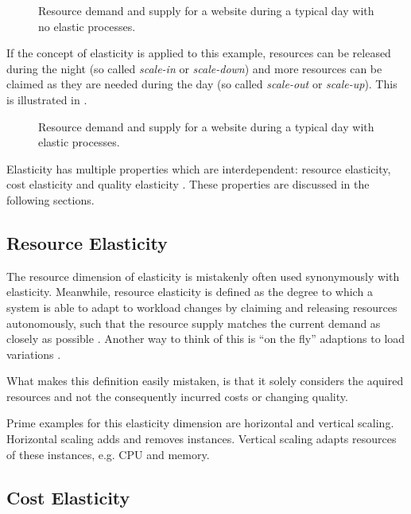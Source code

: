 \begin{figure}
    \centering
    
    \caption{Resource demand and supply for a website during a typical day with no elastic processes.}
    \label{fig:elasticity-application-no-scaling}
\end{figure}

If the concept of elasticity is applied to this example, resources can be released during the night (so called \textit{scale-in} or \textit{scale-down}) and more resources can be claimed as they are needed during the day (so called \textit{scale-out} or \textit{scale-up}). This is illustrated in .

\begin{figure}
    \centering
    
    \caption{Resource demand and supply for a website during a typical day with elastic processes.}
    \label{fig:elasticity-application-scaling}
\end{figure}

Elasticity has multiple properties which are interdependent: resource elasticity, cost elasticity and quality elasticity \cite{dustdarPrinciplesElasticProcesses2011}. These properties are discussed in the following sections.

\subsection{Resource Elasticity}

The resource dimension of elasticity is mistakenly often used synonymously with elasticity. Meanwhile, resource elasticity is defined as the degree to which a system is able to adapt to workload changes by claiming and releasing resources autonomously, such that the resource supply matches the current demand as closely as possible \cite{herbstElasticityCloudComputing2013}. Another way to think of this is ``on the fly'' adaptions to load variations \cite{al-dhuraibiElasticityCloudComputing2018}.

What makes this definition easily mistaken, is that it solely considers the aquired resources and not the consequently incurred costs or changing quality.

Prime examples for this elasticity dimension are horizontal and vertical scaling. Horizontal scaling adds and removes instances. Vertical scaling adapts resources of these instances, e.g. CPU and memory.

\subsection{Cost Elasticity}

